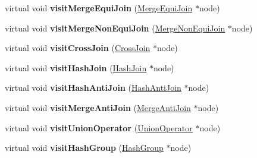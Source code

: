 \begin{DoxyCompactItemize}
\item 
\hypertarget{class_physical_operator_visitor_a4a90fb4cad8fe3ab4877f6ee6f43e1e5}{virtual void {\bfseries visit\+Merge\+Equi\+Join} (\hyperlink{class_merge_equi_join}{Merge\+Equi\+Join} $\ast$node)}\label{class_physical_operator_visitor_a4a90fb4cad8fe3ab4877f6ee6f43e1e5}

\item 
\hypertarget{class_physical_operator_visitor_a9f8bd69369f2fff2bbc74b7aadceaab5}{virtual void {\bfseries visit\+Merge\+Non\+Equi\+Join} (\hyperlink{class_merge_non_equi_join}{Merge\+Non\+Equi\+Join} $\ast$node)}\label{class_physical_operator_visitor_a9f8bd69369f2fff2bbc74b7aadceaab5}

\item 
\hypertarget{class_physical_operator_visitor_a897e543962a692f2725ff7742efae056}{virtual void {\bfseries visit\+Cross\+Join} (\hyperlink{class_cross_join}{Cross\+Join} $\ast$node)}\label{class_physical_operator_visitor_a897e543962a692f2725ff7742efae056}

\item 
\hypertarget{class_physical_operator_visitor_aedb5da87c0637ad8097b7c2eb129129e}{virtual void {\bfseries visit\+Hash\+Join} (\hyperlink{class_hash_join}{Hash\+Join} $\ast$node)}\label{class_physical_operator_visitor_aedb5da87c0637ad8097b7c2eb129129e}

\item 
\hypertarget{class_physical_operator_visitor_af1ce499e2c6db52ed03c3e5f57d144d3}{virtual void {\bfseries visit\+Hash\+Anti\+Join} (\hyperlink{class_hash_anti_join}{Hash\+Anti\+Join} $\ast$node)}\label{class_physical_operator_visitor_af1ce499e2c6db52ed03c3e5f57d144d3}

\item 
\hypertarget{class_physical_operator_visitor_a3d44b3e23abc47c8c0c56938c12ed98a}{virtual void {\bfseries visit\+Merge\+Anti\+Join} (\hyperlink{class_merge_anti_join}{Merge\+Anti\+Join} $\ast$node)}\label{class_physical_operator_visitor_a3d44b3e23abc47c8c0c56938c12ed98a}

\item 
\hypertarget{class_physical_operator_visitor_adbb3e6618904bc7e6d0b6aa3958132e9}{virtual void {\bfseries visit\+Union\+Operator} (\hyperlink{class_union_operator}{Union\+Operator} $\ast$node)}\label{class_physical_operator_visitor_adbb3e6618904bc7e6d0b6aa3958132e9}

\item 
\hypertarget{class_physical_operator_visitor_aa5591d034ce34887c813affc48b7a19c}{virtual void {\bfseries visit\+Hash\+Group} (\hyperlink{class_hash_group}{Hash\+Group} $\ast$node)}\label{class_physical_operator_visitor_aa5591d034ce34887c813affc48b7a19c}


\end{DoxyCompactItemize}
